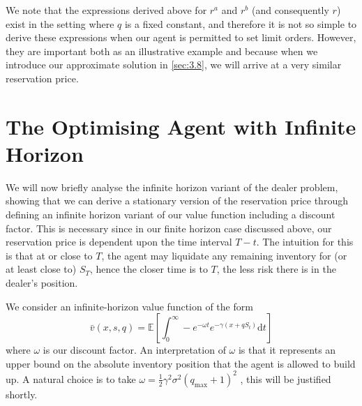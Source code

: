 We note that the expressions derived above for $r^a$ and $r^b$ (and consequently $r$)
exist in the setting where $q$ is a fixed constant, and therefore it is not so simple
to derive these expressions when our agent is permitted to set limit orders. However,
they are important both as an illustrative example and because when we introduce our 
approximate solution in \ref{sec:3.8}, we will arrive at a very similar reservation price.

\section{The Optimising Agent with Infinite Horizon}\label{sec:3.4}
We will now briefly analyse the infinite horizon variant of the dealer problem, showing
that we can derive a stationary version of the reservation price through defining
an infinite horizon variant of our value function including a discount factor. This is
necessary since in our finite horizon case discussed above, our reservation price is
dependent upon the time interval $T-t.$ The intuition for this is that at or close to 
$T$, the agent may liquidate any remaining inventory for (or at least close to) $S_T$,
hence the closer time is to $T$, the less risk there is in the dealer's position.

We consider an infinite-horizon value function of the form
\begin{equation*}
    \bar v(x,s,q)=\mathbb{E}\left[\int_{0}^{\infty}-e^{-\omega t}e^{-\gamma(x+qS_t)}\mathrm dt\right]
\end{equation*}
where $\omega$ is our discount factor. An interpretation of $\omega$ is that it
represents an upper bound on the absolute inventory position that the agent is allowed
to build up. A natural choice is to take $\omega=\frac{1}{2}\gamma^2\sigma^2(q_{\textrm{max}}+1)^2$
, this will be justified shortly. 

